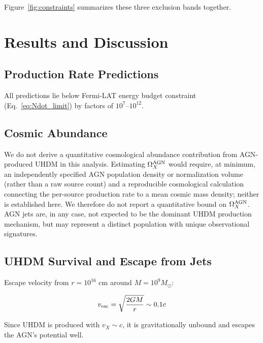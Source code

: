 \documentclass[twocolumn,superscriptaddress,prd,nofootinbib]{revtex4-2}
\begin{document}
Figure~\ref{fig:constraints} summarizes these three exclusion bands together.

\section{Results and Discussion}
\label{sec:results}

\subsection{Production Rate Predictions}

All predictions lie below Fermi-LAT energy budget constraint (Eq.~\ref{eq:Ndot_limit}) by factors of $10^7$--$10^{12}$.

\subsection{Cosmic Abundance}

We do not derive a quantitative cosmological abundance contribution from AGN-produced UHDM in this analysis. Estimating $\Omega_X^{\rm AGN}$ would require, at minimum, an independently specified AGN population density or normalization volume (rather than a raw source count) and a reproducible cosmological calculation connecting the per-source production rate to a mean cosmic mass density; neither is established here. We therefore do not report a quantitative bound on $\Omega_X^{\rm AGN}$. AGN jets are, in any case, not expected to be the dominant UHDM production mechanism, but may represent a distinct population with unique observational signatures.

\subsection{UHDM Survival and Escape from Jets}

Escape velocity from $r = 10^{16}$ cm around $M = 10^9 M_\odot$:

\begin{equation}
v_{\rm esc} = \sqrt{\frac{2GM}{r}} \sim 0.1c
\label{eq:v_esc}
\end{equation}

Since UHDM is produced with $v_X \sim c$, it is gravitationally unbound and escapes the AGN's potential well.
\end{document}
